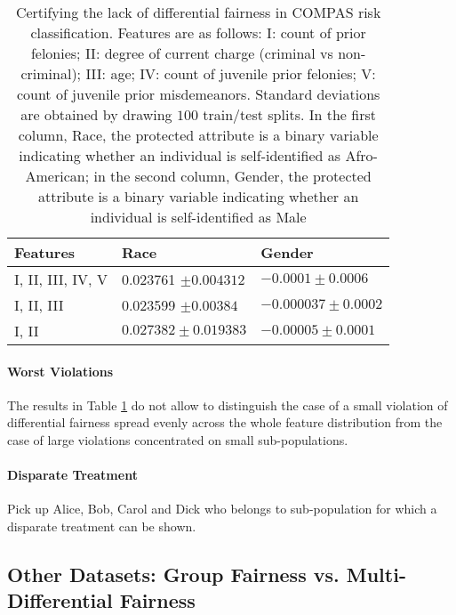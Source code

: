 \documentclass{article}
\begin{document}
\begin{table}[h!]
	\begin{tabular}{lll}
		Features & Race    & Gender  \\
		\hline
		I, II, III, IV, V         & 0.023761 $\pm 0.004312$ &   $-0.0001 \pm 0.0006$        \\
		I, II, III         & 0.023599 $\pm 0.00384$&     $-0.000037 \pm 0.0002$       \\
		I, II          & $0.027382 \pm 0.019383$ & $-0.00005 \pm 0.0001$         \\
		\hline 
	\end{tabular}
	\label{tab: 1}
	\caption{Certifying the lack of differential fairness in COMPAS risk classification. Features are as follows: I: count of prior felonies; II: degree of current charge (criminal vs non-criminal); III: age; IV: count of juvenile prior felonies; V: count of juvenile prior misdemeanors. Standard deviations are obtained by drawing $100$ train/test splits. In the first column, Race, the protected attribute is a binary variable indicating whether an individual is self-identified as Afro-American; in the second column, Gender, the protected attribute is a binary variable indicating whether an individual is self-identified as Male}
\end{table}

\paragraph{Worst Violations}
The results in Table \ref{tab: 1} do not allow to distinguish the case of a small violation of differential fairness spread evenly across the whole feature distribution from the case of large violations concentrated on small sub-populations. 


\paragraph{Disparate Treatment}
Pick up Alice, Bob, Carol and Dick who belongs to sub-population for which a disparate treatment can be shown. 


\subsection{Other Datasets: Group Fairness vs. Multi-Differential Fairness}


\end{document}
